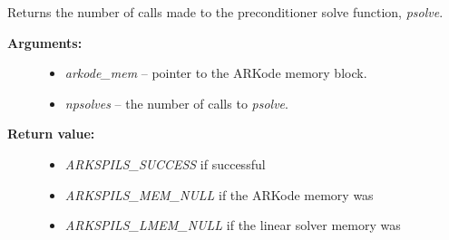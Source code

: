 \documentclass[letterpaper,10pt,english]{sphinxmanual}
\begin{document}
\begin{fulllineitems}
\label{c_interface/User_callable:ARKSpilsGetNumPrecSolves}
Returns the number of calls made to the preconditioner
solve function, \emph{psolve}.
\begin{description}
\item[{\textbf{Arguments:}}] \leavevmode\begin{itemize}
\item {} 
\emph{arkode\_mem} -- pointer to the ARKode memory block.

\item {} 
\emph{npsolves} -- the number of calls to \emph{psolve}.

\end{itemize}

\item[{\textbf{Return value:}}] \leavevmode\begin{itemize}
\item {} 
\emph{ARKSPILS\_SUCCESS} if successful

\item {} 
\emph{ARKSPILS\_MEM\_NULL} if the ARKode memory was 

\item {} 
\emph{ARKSPILS\_LMEM\_NULL} if the linear solver memory was 

\end{itemize}

\end{description}

\end{fulllineitems}

\end{document}
